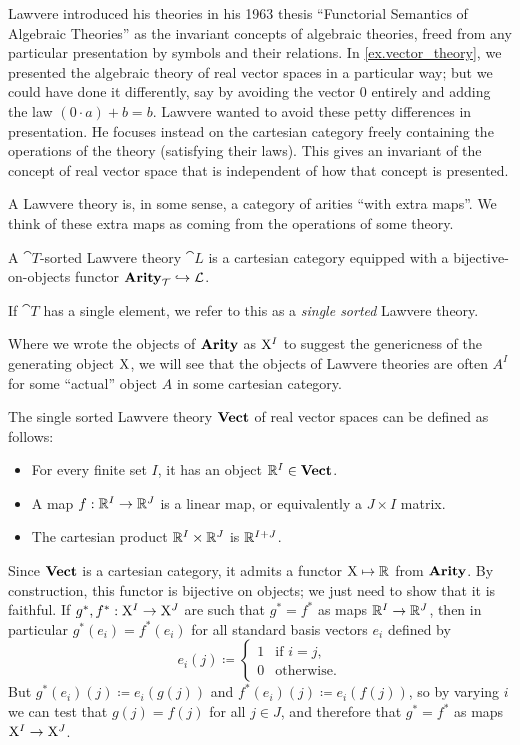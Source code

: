 \documentclass[DynamicalBook]{subfiles}
\begin{document}
Lawvere introduced his theories in his 1963 thesis ``Functorial Semantics of
Algebraic Theories'' \cite{} as the invariant concepts of algebraic theories,
freed from any particular presentation by symbols and their relations. In
\cref{ex.vector_theory}, we presented the algebraic theory of real vector spaces
in a particular way; but we could have done it differently, say by avoiding the
vector $0$
entirely and adding the law $(0 \cdot a) + b = b$. Lawvere wanted to avoid these
petty differences in presentation. He focuses
instead on the cartesian category freely
containing the operations of the theory (satisfying their laws). This gives an invariant
of the concept of real vector space that is independent of how that concept is presented.

A Lawvere theory is, in some sense, a category of arities ``with extra maps''.
We think of these extra maps as coming from the operations of some theory.
\begin{definition}
A $\cat{T}$-sorted Lawvere theory $\cat{L}$ is a cartesian category equipped with a bijective-on-objects functor $\textbf{Arity}_{\mathcal{T}} \hookrightarrow
\mathcal{L}$. 

If $\cat{T}$ has a single element, we refer to this as a \emph{single sorted}
Lawvere theory.
\end{definition}

Where we wrote the objects of $\textbf{Arity}$ as $\mathrm{X}^I$ to suggest the genericness of
the generating object $\mathrm{X}$, we will see that the objects
of Lawvere theories are often $A^I$ for some ``actual'' object $A$ in some
cartesian category.
\begin{example}
  The single sorted Lawvere theory $\textbf{Vect}$ of real vector spaces can be defined as follows:
  \begin{itemize}
    \item For every finite set $I$, it has an object $\mathbb{R}^I \in \textbf{Vect}$.
    \item A map $f : \mathbb{R}^I \to \mathbb{R}^J$ is a linear map, or equivalently a $J
      \times I$ matrix.
    \item The cartesian product $\mathbb{R}^I \times \mathbb{R}^J$ is $\mathbb{R}^{I + J}$.
 \end{itemize}

 Since $\textbf{Vect}$ is a cartesian category, it admits a functor $\mathrm{X} \mapsto
 \mathbb{R}$ from $\textbf{Arity}$. By construction, this functor is bijective on objects; we
 just need to show that it is faithful. If $g^{\ast}, f^{\ast} : \mathrm{X}^I \to
 \mathrm{X}^J$ are such that $g^{\ast} = f^{\ast}$ as maps $\mathbb{R}^I \to \mathbb{R}^J$, then in
 particular $g^{\ast}(e_i) =f^{\ast}(e_i)$ for all standard basis vectors $e_i$
 defined by
\[
e_i(j) \coloneqq \begin{cases} 1 &\mbox{if $i = j$,} \\0 &\mbox{otherwise.} \end{cases}
\]
But $g^{\ast}(e_i)(j) \coloneqq e_i(g(j))$ and $f^{\ast}(e_i)(j) \coloneqq
e_i(f(j))$, so by varying $i$ we can test that $g(j) = f(j)$ for all $j \in J$,
and therefore that $g^{\ast} = f^{\ast}$ as maps $\mathrm{X}^I \to \mathrm{X}^J$.
\end{example}
\end{document}
